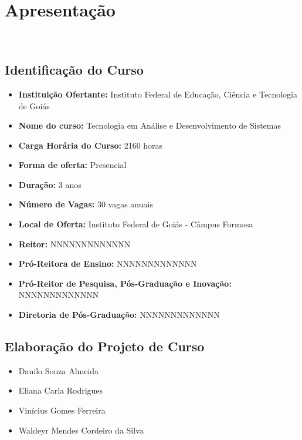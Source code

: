 \documentclass[11pt,fleqn]{book} %
\begin{document}
\renewcommand\contentsname{Sumário}
\tableofcontents

\chapter{Apresentação}\label{apresentacao}
\vspace{6em}
\begin{flushright}
	\textit{\textcolor{white}{Um bonita citação...}}
\end{flushright}
\vspace{6em}

\section{Identificação do Curso}
\begin{itemize}
	\item \textbf{Instituição Ofertante:} Instituto Federal de Educação, Ciência e Tecnologia de Goiás
	\item \textbf{Nome do curso:} Tecnologia em Análise e Desenvolvimento de Sistemas
	\item \textbf{Carga Horária do Curso:} 2160 horas
	\item \textbf{Forma de oferta:} Presencial
	\item \textbf{Duração:} 3 anos
	\item \textbf{Número de Vagas:} 30 vagas anuais
	\item \textbf{Local de Oferta:} Instituto Federal de Goiás - Câmpus Formosa
	\item \textbf{Reitor:} NNNNNNNNNNNNN
	\item \textbf{Pró-Reitora de Ensino:} NNNNNNNNNNNNN
	\item \textbf{Pró-Reitor de Pesquisa, Pós-Graduação e Inovação:} NNNNNNNNNNNNN
	\item \textbf{Diretoria de Pós-Graduação:} NNNNNNNNNNNNN
\end{itemize}

\section{Elaboração do Projeto de Curso}
\begin{itemize}[label=\bfseries]
	\item Danilo Souza Almeida
	\item Eliana Carla Rodrigues
	\item Vinícius Gomes Ferreira
	\item Waldeyr Mendes Cordeiro da Silva
\end{itemize}
\end{document}
